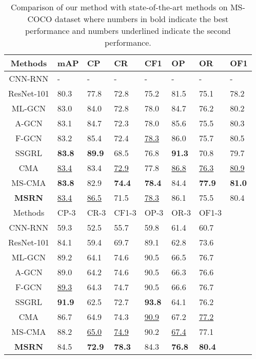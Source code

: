 \documentclass{article} \usepackage{nips14submit_e,times}
\begin{document}
\begin{table*}[t]
\caption{Comparison of our method with state-of-the-art methods on MS-COCO dataset where numbers in bold indicate the best performance and numbers underlined indicate the second performance.}
\label{table:coco}
\centering \scriptsize
\begin{tabular}{c|lllllll}
\hline
Methods & {mAP} &{CP} & {CR} & {CF1} & {OP} & {OR} & {OF1}  \\ \hline
CNN-RNN\cite{CVPR2016:ULMIC} & - & {-} & {-} & {-} & {-} & {-} & {-} \\
ResNet-101\cite{ResNet} & 80.3 & {77.8} & {72.8} & {75.2} & {81.5} & {75.1} & {78.2} \\
ML-GCN\cite{CVPR2019:ML-GCN} & 83.0 & 84.0 & {72.8} & 78.0 & 84.7 & {76.2} & 80.2 \\
A-GCN\cite{PRL:2020:AGCN} & {83.1} & {84.7} & {72.3} & {78.0} & 85.6 & 75.5 & 80.3 \\
F-GCN\cite{CIKM2020:FGCN} & {83.2} & {85.4} & 72.4 & \underline{78.3} & 86.0 & {75.7} & {80.5}\\
SSGRL\cite{ICCV2019:ssgrl} & \textbf{83.8} & \textbf{89.9} & {68.5} & {76.8} & \textbf{91.3} & {70.8} & {79.7}\\
CMA\cite{AAAI2020:CMA} & \underline{83.4} & {83.4} & \underline{72.9} & {77.8} & \underline{86.8} & \underline{76.3} & \underline{80.9}  \\
MS-CMA\cite{AAAI2020:CMA} & \textbf{83.8} & {82.9} & \textbf{74.4} & \textbf{78.4} & 84.4 & \textbf{77.9} & \textbf{81.0} \\

\textbf{MSRN} & \underline{83.4} & \underline{86.5} & 71.5 & \underline{78.3} & {86.1} & {75.5} & {80.4}  \\ \hline\hline

Methods & {CP-3} & {CR-3} & {CF1-3} & {OP-3} & {OR-3} & {OF1-3} &\\ \hline
CNN-RNN\cite{CVPR2016:ULMIC}  & 59.3 & 52.5 & 55.7& 59.8 & 61.4 & 60.7 \\
ResNet-101\cite{ResNet} & 84.1 & 59.4 & 69.7& 89.1 & 62.8 & 73.6 \\
ML-GCN\cite{CVPR2019:ML-GCN} & {89.2} & 64.1 & 74.6& {90.5} & 66.5 & 76.7 \\
A-GCN\cite{PRL:2020:AGCN} & 89.0 & 64.2 & 74.6& {90.5} & 66.3 & 76.6 \\
F-GCN\cite{CIKM2020:FGCN}  & \underline{89.3} & 64.3 & {74.7} & {90.5} & 66.6 & 76.7\\
SSGRL\cite{ICCV2019:ssgrl} & \textbf{91.9} & 62.5 & 72.7 & \textbf{93.8} & 64.1 & {76.2} \\
CMA\cite{AAAI2020:CMA}  & 86.7 & 64.9 & 74.3 & \underline{90.9} & 67.2 & \underline{77.2} \\
MS-CMA\cite{AAAI2020:CMA} & 88.2 & \underline{65.0} & \underline{74.9} & 90.2 & \underline{67.4} & 77.1 \\
\textbf{MSRN} & {84.5} & \textbf{72.9} & \textbf{78.3}& 84.3 & \textbf{76.8} & \textbf{80.4} \\ \hline\hline
\end{tabular}
\end{table*}
\end{document}
